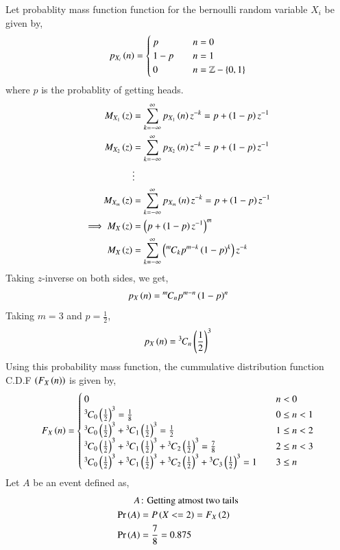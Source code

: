 \documentclass[journal]{IEEEtran}
\begin{document}
Let probablity mass function function for the bernoulli random variable $X_{i}$ be given by,
\begin{align}
    p_{X_{i}}\left(n\right) = \begin{cases}
        p & \quad n = 0\\
        1 - p & \quad n = 1\\
        0 & \quad n = \mathbb{Z} - \left\{0, 1\right\}
    \end{cases}
\end{align}
where $p$ is the probablity of getting heads.
\begin{align}
    M_{X_1}\left(z\right) &= \sum_{k = -\infty}^{\infty} p_{X_{1}}\left(n\right) z^{-k} = p + \left(1 - p\right) z^{-1}\\
    M_{X_2}\left(z\right) &= \sum_{k = -\infty}^{\infty} p_{X_{2}}\left(n\right) z^{-k} = p + \left(1 - p\right) z^{-1}\\
                    &\vdots\\
    M_{X_m}\left(z\right) &= \sum_{k = -\infty}^{\infty} p_{X_{m}}\left(n\right) z^{-k} = p + \left(1 - p\right) z^{-1}\\
    \implies M_{X}\left(z\right) &= \left(p + \left(1 - p\right) z^{-1}\right)^{m}\\
    M_{X}\left(z\right) &= \sum_{k = -\infty}^{\infty} \left({{}^{m}\mkern-1muC_{k}} p^{m - k} \left(1 - p\right)^{k}\right) z^{-k}\\
\end{align}
Taking $z$-inverse on both sides, we get,
\begin{align}
    p_{X}\left(n\right) = {{}^{m}\mkern-1muC_{n}} p^{m - n} \left(1 - p\right)^{n}
\end{align}
Taking $m = 3$ and $p = \frac{1}{2}$,
\begin{align}
    p_{X}\left(n\right) = {{}^{3}\mkern-1muC_{n}} \left(\frac{1}{2}\right)^{3}
\end{align}
Using this probability mass function, the cummulative distribution function C.D.F $\left(F_{X}\left(n\right)\right)$ is given by,
\begin{align}
    F_{X}\left(n\right) = \begin{cases}
        0 & \quad n < 0\\
        {{}^{3}\mkern-1muC_{0}}\left(\frac{1}{2}\right)^3 = \frac{1}{8} & \quad 0 \leq n < 1\\
        {{}^{3}\mkern-1muC_{0}}\left(\frac{1}{2}\right)^3 + {{}^{3}\mkern-1muC_{1}}\left(\frac{1}{2}\right)^3 = \frac{1}{2} & \quad 1 \leq n < 2\\
        {{}^{3}\mkern-1muC_{0}}\left(\frac{1}{2}\right)^3 + {{}^{3}\mkern-1muC_{1}}\left(\frac{1}{2}\right)^3 + {{}^{3}\mkern-1muC_{2}}\left(\frac{1}{2}\right)^3 = \frac{7}{8} & \quad 2 \leq n < 3\\
        {{}^{3}\mkern-1muC_{0}}\left(\frac{1}{2}\right)^3 + {{}^{3}\mkern-1muC_{1}}\left(\frac{1}{2}\right)^3 + {{}^{3}\mkern-1muC_{2}}\left(\frac{1}{2}\right)^3 + {{}^{3}\mkern-1muC_{3}}\left(\frac{1}{2}\right)^3 = 1 & \quad 3 \leq n
    \end{cases}
\end{align}
Let $A$ be an event defined as,
\begin{align}
    A&\colon\text{Getting atmost two tails}\\
    \Pr\left(A\right) &= P\left(X<=2\right) = F_{X}\left(2\right)\\
    \Pr\left(A\right) &= \frac{7}{8} = 0.875
\end{align}
\end{document}
